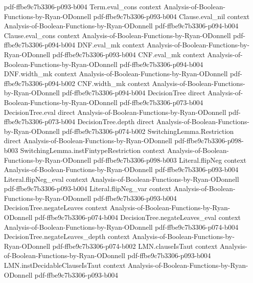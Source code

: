 \begin{theorem}
  {pdf-ffbe9c7b3306-p093-b004}
\proofstep
  {Term.eval_cons}
  {context}
  {Analysis-of-Boolean-Functions-by-Ryan-ODonnell}
  {pdf-ffbe9c7b3306-p093-b004}
\proofstep
  {Clause.eval_nil}
  {context}
  {Analysis-of-Boolean-Functions-by-Ryan-ODonnell}
  {pdf-ffbe9c7b3306-p094-b004}
\proofstep
  {Clause.eval_cons}
  {context}
  {Analysis-of-Boolean-Functions-by-Ryan-ODonnell}
  {pdf-ffbe9c7b3306-p094-b004}
\proofstep
  {DNF.eval_mk}
  {context}
  {Analysis-of-Boolean-Functions-by-Ryan-ODonnell}
  {pdf-ffbe9c7b3306-p093-b004}
\proofstep
  {CNF.eval_mk}
  {context}
  {Analysis-of-Boolean-Functions-by-Ryan-ODonnell}
  {pdf-ffbe9c7b3306-p094-b004}
\proofstep
  {DNF.width_mk}
  {context}
  {Analysis-of-Boolean-Functions-by-Ryan-ODonnell}
  {pdf-ffbe9c7b3306-p094-b002}
\proofstep
  {CNF.width_mk}
  {context}
  {Analysis-of-Boolean-Functions-by-Ryan-ODonnell}
  {pdf-ffbe9c7b3306-p094-b004}
\proofstep
  {DecisionTree}
  {direct}
  {Analysis-of-Boolean-Functions-by-Ryan-ODonnell}
  {pdf-ffbe9c7b3306-p073-b004}
\proofstep
  {DecisionTree.eval}
  {direct}
  {Analysis-of-Boolean-Functions-by-Ryan-ODonnell}
  {pdf-ffbe9c7b3306-p073-b004}
\proofstep
  {DecisionTree.depth}
  {direct}
  {Analysis-of-Boolean-Functions-by-Ryan-ODonnell}
  {pdf-ffbe9c7b3306-p074-b002}
\proofstep
  {SwitchingLemma.Restriction}
  {direct}
  {Analysis-of-Boolean-Functions-by-Ryan-ODonnell}
  {pdf-ffbe9c7b3306-p098-b003}
\proofstep
  {SwitchingLemma.instFintypeRestriction}
  {context}
  {Analysis-of-Boolean-Functions-by-Ryan-ODonnell}
  {pdf-ffbe9c7b3306-p098-b003}
\proofstep
  {Literal.flipNeg}
  {context}
  {Analysis-of-Boolean-Functions-by-Ryan-ODonnell}
  {pdf-ffbe9c7b3306-p093-b004}
\proofstep
  {Literal.flipNeg_eval}
  {context}
  {Analysis-of-Boolean-Functions-by-Ryan-ODonnell}
  {pdf-ffbe9c7b3306-p093-b004}
\proofstep
  {Literal.flipNeg_var}
  {context}
  {Analysis-of-Boolean-Functions-by-Ryan-ODonnell}
  {pdf-ffbe9c7b3306-p093-b004}
\proofstep
  {DecisionTree.negateLeaves}
  {context}
  {Analysis-of-Boolean-Functions-by-Ryan-ODonnell}
  {pdf-ffbe9c7b3306-p074-b004}
\proofstep
  {DecisionTree.negateLeaves_eval}
  {context}
  {Analysis-of-Boolean-Functions-by-Ryan-ODonnell}
  {pdf-ffbe9c7b3306-p074-b004}
\proofstep
  {DecisionTree.negateLeaves_depth}
  {context}
  {Analysis-of-Boolean-Functions-by-Ryan-ODonnell}
  {pdf-ffbe9c7b3306-p074-b002}
\proofstep
  {LMN.clauseIsTaut}
  {context}
  {Analysis-of-Boolean-Functions-by-Ryan-ODonnell}
  {pdf-ffbe9c7b3306-p093-b004}
\proofstep
  {LMN.instDecidableClauseIsTaut}
  {context}
  {Analysis-of-Boolean-Functions-by-Ryan-ODonnell}
  {pdf-ffbe9c7b3306-p093-b004}

\end{theorem}

